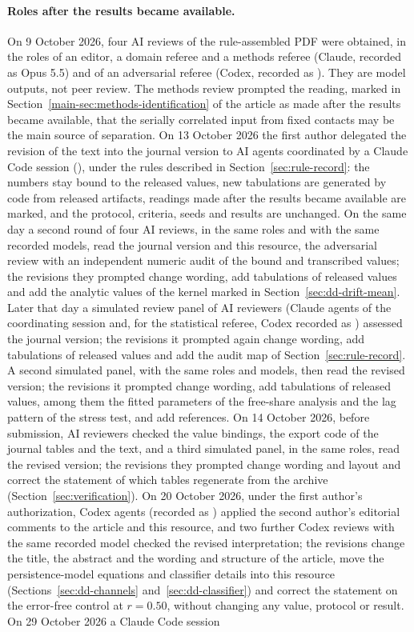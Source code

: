 \paragraph{Roles after the results became available.}
On 9 October 2026, four AI reviews of the rule-assembled PDF were obtained, in the roles of an editor, a domain referee and a methods referee (Claude, recorded as Opus 5.5) and of an adversarial referee (Codex, recorded as ). They are model outputs, not peer review. The methods review prompted the reading, marked in Section~\ref{main-sec:methods-identification} of the article as made after the results became available, that the serially correlated input from fixed contacts may be the main source of separation. On 13 October 2026 the first author delegated the revision of the text into the journal version to AI agents coordinated by a Claude Code session (), under the rules described in Section~\ref{sec:rule-record}: the numbers stay bound to the released values, new tabulations are generated by code from released artifacts, readings made after the results became available are marked, and the protocol, criteria, seeds and results are unchanged. On the same day a second round of four AI reviews, in the same roles and with the same recorded models, read the journal version and this resource, the adversarial review with an independent numeric audit of the bound and transcribed values; the revisions they prompted change wording, add tabulations of released values and add the analytic values of the kernel marked in Section~\ref{sec:dd-drift-mean}. Later that day a simulated review panel of AI reviewers (Claude agents of the coordinating session and, for the statistical referee, Codex recorded as ) assessed the journal version; the revisions it prompted again change wording, add tabulations of released values and add the audit map of Section~\ref{sec:rule-record}. A second simulated panel, with the same roles and models, then read the revised version; the revisions it prompted change wording, add tabulations of released values, among them the fitted parameters of the free-share analysis and the lag pattern of the stress test, and add references. On 14 October 2026, before submission, AI reviewers checked the value bindings, the export code of the journal tables and the text, and a third simulated panel, in the same roles, read the revised version; the revisions they prompted change wording and layout and correct the statement of which tables regenerate from the archive (Section~\ref{sec:verification}). On 20 October 2026, under the first author's authorization, Codex agents (recorded as ) applied the second author's editorial comments to the article and this resource, and two further Codex reviews with the same recorded model checked the revised interpretation; the revisions change the title, the abstract and the wording and structure of the article, move the persistence-model equations and classifier details into this resource (Sections~\ref{sec:dd-channels} and~\ref{sec:dd-classifier}) and correct the statement on the error-free control at $r=0.50$, without changing any value, protocol or result. On 29 October 2026 a Claude Code session 